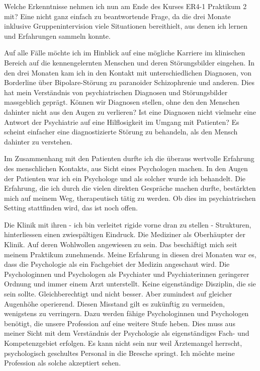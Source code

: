 Welche Erkenntnisse nehmen ich nun am Ende des Kurses ER4-1 Praktikum 2 mit? Eine nicht ganz einfach zu beantwortende Frage, da die drei Monate inklusive Gruppenintervision viele Situationen bereithielt, aus denen ich lernen und Erfahrungen sammeln konnte.

Auf alle Fälle möchte ich im Hinblick auf eine mögliche Karriere im klinischen Bereich auf die kennengelernten Menschen und deren Störungsbilder eingehen. In den drei Monaten kam ich in den Kontakt mit unterschiedlichen Diagnosen, von Borderline über Bipolare-Störung zu paranoider Schizophrenie und anderen. Dies hat mein Verständnis von psychiatrischen Diagnosen und Störungsbilder massgeblich geprägt. Können wir Diagnosen stellen, ohne den den Menschen dahinter nicht aus den Augen zu verlieren? Ist eine Diagnosen nicht vielmehr eine Antwort der Psychiatrie auf eine Hilflosigkeit im Umgang mit Patienten? Es scheint einfacher eine diagnostizierte Störung  zu behandeln, als den Mensch dahinter zu verstehen.

Im Zusammenhang mit den Patienten durfte ich die überaus wertvolle Erfahrung des menschlichen Kontakts, aus Sicht eines Psychologen machen. In den Augen der Patienten war ich ein Psychologe und als solcher wurde ich behandelt. Die Erfahrung, die ich durch die vielen direkten Gespräche machen durfte, bestärkten mich auf meinem Weg, therapeutisch tätig zu werden. Ob dies im psychiatrischen Setting stattfinden wird, das ist noch offen.

Die Klinik mit ihren - ich bin verleitet \glqq rigide\grqq{} vorne dran zu stellen - Strukturen, hinterliessen einen zwiespältigen Eindruck. Die Mediziner als Oberhäupter der Klinik. Auf deren Wohlwollen angewiesen zu sein. Das beschäftigt mich seit meinem Praktikum zunehmends. Meine Erfahrung in diesen drei Monaten war es, dass die Psychologie als ein Fachgebiet der Medizin angeschaut wird. Die Psychologinnen und Psychologen als Psychiater und Psychiaterinnen geringerer Ordnung und immer einem Arzt unterstellt. Keine eigenständige Disziplin, die sie sein sollte. Gleichberechtigt und nicht besser. Aber zumindest auf gleicher Augenhöhe operierend. Diesen Misstand gilt es zukünftig zu vermeiden, wenigstens zu verringern. Dazu werden fähige Psychologinnen und Psychologen benötigt, die unsere Profession auf eine weitere Stufe heben. Dies muss aus meiner Sicht mit dem Verständnis der Psychologie als eigenständiges Fach- und Kompetenzgebiet erfolgen. Es kann nicht sein nur weil Ärztemangel herrscht, psychologisch geschultes Personal in die Bresche springt. Ich möchte meine Profession als solche akzeptiert sehen.

